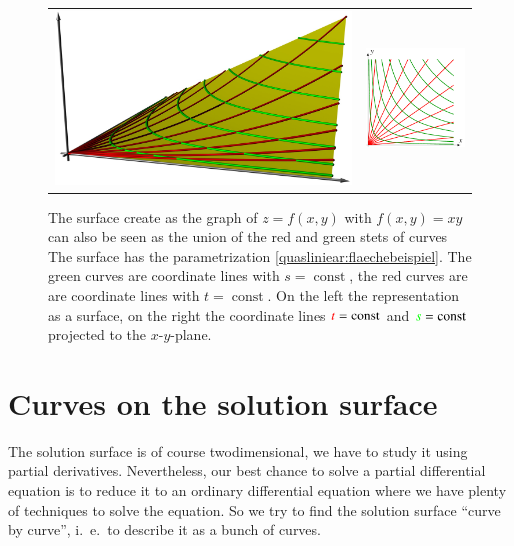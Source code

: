%
%
%
\begin{figure}
\centering
\begin{tabular}{cc}
\includegraphics[width=0.6\hsize]{../common/3d/surface.jpg}&%
\includegraphics[width=0.35\hsize]{3-geometry/images/hypkurv.pdf}
\end{tabular}
\caption{The surface create as the graph of $z=f(x,y)$ with $f(x,y)=xy$
can also be seen as the union of the red and green stets of curves
The surface has the parametrization \eqref{quasliniear:flaechebeispiel}.
The green curves are coordinate lines with $s=\operatorname{const}$,
the red curves are are coordinate lines with $t=\operatorname{const}$.
On the left the representation as a surface, on the right the coordinate
lines
${\color{red}t}=\operatorname{const}$
and
${\color{green}s}=\operatorname{const}$
projected to the $x$-$y$-plane.
\label{quasilinear:flaechenalskurven}
}
\end{figure}

\section{Curves on the solution surface}
The solution surface is of course twodimensional, we have to study it
using partial derivatives.
Nevertheless, our best chance to solve a partial differential equation is to 
reduce it to an ordinary differential equation where we have plenty
of techniques to solve the equation.
So we try to find the solution surface ``curve by curve'', i.~e.~to describe
it as a bunch of curves.

